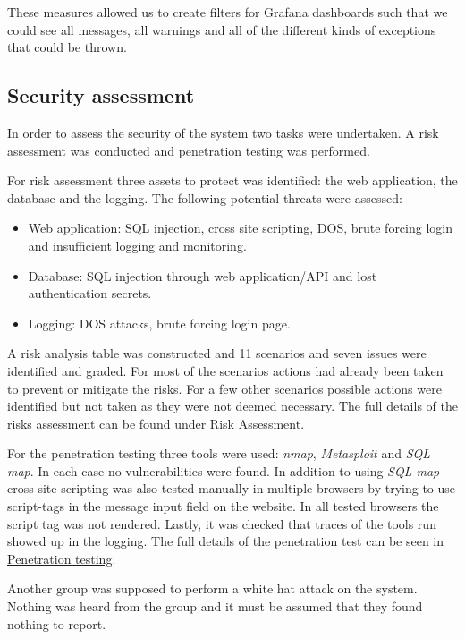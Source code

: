 These measures allowed us to create filters for Grafana dashboards such that we could see all messages, all warnings and all of the different kinds of exceptions that could be thrown. 


\subsection{Security assessment}
In order to assess the security of the system two tasks were undertaken. A risk assessment was conducted and penetration testing was performed.

For risk assessment three assets to protect was identified: the web application, the database and the logging. The following potential threats were assessed:
\begin{itemize}
    \item Web application: SQL injection, cross site scripting, DOS, brute forcing login and insufficient logging and monitoring.
    \item Database: SQL injection through web application/API and lost authentication secrets.
    \item Logging: DOS attacks, brute forcing login page.
\end{itemize}

A risk analysis table was constructed and 11 scenarios and seven issues were identified and graded. For most of the scenarios actions had already been taken to prevent or mitigate the risks. For a few other scenarios possible actions were identified but not taken as they were not deemed necessary. The full details of the risks assessment can be found under \underline{\href{https://github.com/DevOps2021-gb/devops2021/wiki/Risk-assesment}{Risk Assessment}}.

For the penetration testing three tools were used: \textit{nmap}, \textit{Metasploit} and \textit{SQL map}. In each case no vulnerabilities were found. In addition to using \textit{SQL map} cross-site scripting was also tested manually in multiple browsers by trying to use script-tags in the message input field on the website. In all tested browsers the script tag was not rendered. Lastly, it was checked that traces of the tools run showed up in the logging. The full details of the penetration test can be seen in \underline{\href{https://github.com/DevOps2021-gb/devops2021/wiki/Penetration-testing}{Penetration testing}}.

Another group was supposed to perform a white hat attack on the system. Nothing was heard from the group and it must be assumed that they found nothing to report.%

